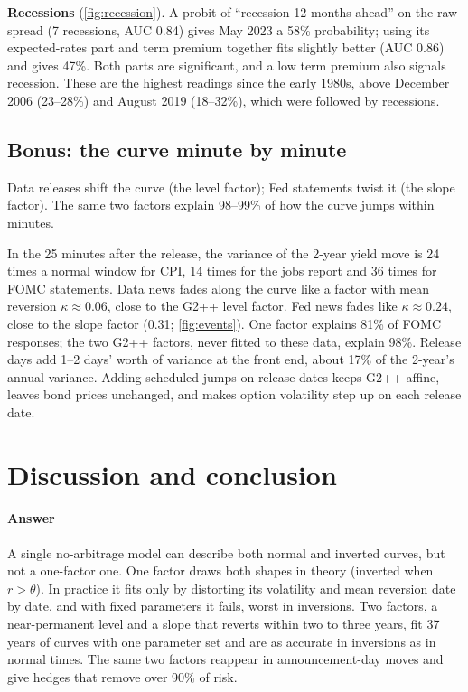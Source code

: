 \textbf{Recessions} (\cref{fig:recession}). A probit of ``recession 12 months ahead'' on the raw spread (7 recessions, AUC 0.84) gives May 2023 a 58\% probability; using its expected-rates part and term premium together fits slightly better (AUC 0.86) and gives 47\%. Both parts are significant, and a low term premium also signals recession. These are the highest readings since the early 1980s, above December 2006 (23--28\%) and August 2019 (18--32\%), which were followed by recessions.

\subsection{Bonus: the curve minute by minute}

\begin{takeaway}
Data releases shift the curve (the level factor); Fed statements twist it (the slope factor). The same two factors explain 98--99\% of how the curve jumps within minutes.
\end{takeaway}

In the 25 minutes after the release, the variance of the 2-year yield move is 24 times a normal window for CPI, 14 times for the jobs report and 36 times for FOMC statements. Data news fades along the curve like a factor with mean reversion $\kappa \approx 0.06$, close to the G2++ level factor. Fed news fades like $\kappa \approx 0.24$, close to the slope factor (0.31; \cref{fig:events}). One factor explains 81\% of FOMC responses; the two G2++ factors, never fitted to these data, explain 98\%. Release days add 1--2 days' worth of variance at the front end, about 17\% of the 2-year's annual variance. Adding scheduled jumps on release dates \citep{piazzesi2005} keeps G2++ affine, leaves bond prices unchanged, and makes option volatility step up on each release date.

\section{Discussion and conclusion}

\paragraph{Answer} A single no-arbitrage model can describe both normal and inverted curves, but not a one-factor one. One factor draws both shapes in theory (inverted when $r>\theta$). In practice it fits only by distorting its volatility and mean reversion date by date, and with fixed parameters it fails, worst in inversions. Two factors, a near-permanent level and a slope that reverts within two to three years, fit 37 years of curves with one parameter set and are as accurate in inversions as in normal times. The same two factors reappear in announcement-day moves and give hedges that remove over 90\% of risk.

